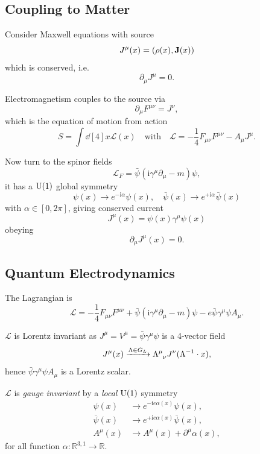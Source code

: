 \documentclass[a4paper,11pt]{article}
\begin{document}
	\subsection{Coupling to Matter}

	Consider Maxwell equations with source 
	\[
		J^\mu(x) = \left( \rho(x), \vb J(x) \right)
	\]
	which is conserved, i.e.\ 
	\[
		\partial_\mu J^\mu = 0.
	\]
	
	Electromagnetism couples to the source via 
	\[
		\partial_\mu F ^{\mu \nu} = J^\nu,
	\]
	which is the equation of motion from action
	\[
		S = \int \dd[4]{x} \mathcal{L}(x) \quad \text{with} \quad \mathcal{L} = - \frac{1}{4} F _{\mu \nu} F ^{\mu \nu} - A _{\mu} J^\mu.
	\]
	
	Now turn to the spinor fields
	\[
		\mathcal{L}_F = \bar \psi(\mathrm{i} \gamma^\mu \partial_\mu - m) \psi,
	\]
	it has a $\operatorname{U}(1)$ global symmetry
	\[
		\psi(x) \to e ^{- \mathrm{i} \alpha} \psi(x), \quad \bar \psi(x) \to e ^{+ \mathrm{i} \alpha} \bar \psi(x)
	\]
	with $\alpha \in [0, 2 \pi]$, giving conserved current
	\[
		J^\mu(x) = \psi(x) \gamma^\mu \psi(x)
	\]
	obeying 
	\[
		\partial_\mu J^\mu(x) = 0.
	\]
	
	\subsection{Quantum Electrodynamics}

	The Lagrangian is
	\[
		\mathcal{L} = - \frac{1}{4} F _{\mu \nu} F ^{\mu \nu} + \bar \psi (\mathrm{i} \gamma^\mu \partial_\mu - m) \psi - e \bar \psi \gamma^\mu \psi A_\mu.
	\]

	$\mathcal{L}$ is Lorentz invariant as $J^\mu = V^\mu = \bar \psi \gamma^\mu \psi$ is a 4-vector field
	\[
		J^\mu (x) \xrightarrow{\Lambda \in G_L} \LT{\mu}{\nu} J^\nu(\Lambda^{-1} \cdot x),
	\]
	hence $\bar \psi \gamma^\mu \psi A_\mu$ is a Lorentz scalar.

	\begin{clm}
		$\mathcal{L}$ is \emph{gauge invariant} by a \emph{local} $\operatorname{U}(1)$ symmetry
		\begin{align*}
			\psi(x) &\to e ^{-\mathrm{i} e \alpha(x)} \psi(x),\\
			\bar \psi(x) &\to e ^{+\mathrm{i} e \alpha(x)} \bar \psi(x),\\
			A^\mu(x) & \to A^\mu(x) + \partial^\mu \alpha(x),
		\end{align*}
		for all function $\alpha: \mathbb{R} ^{3,1} \to \mathbb{R}$.
	\end{clm}
	
\end{document}
